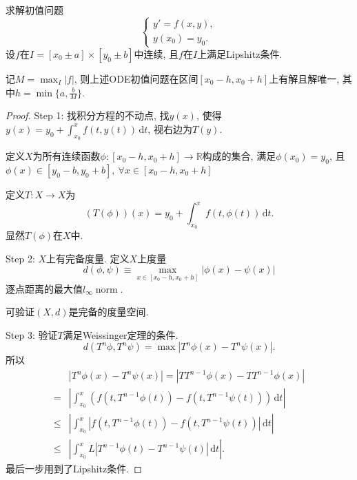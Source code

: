 \begin{theorem}
  求解初值问题
  \begin{equation}
    \begin{cases}
      y' = f(x,y), \\
      y(x_0) = y_0.
    \end{cases}
  \end{equation}
  设$f$在$I = [x_0 \pm a] \times [y_0 \pm b]$中连续, 且$f$在$I$上满足Lipshitz条件.

  记$M = \max _{I} |f|$, 则上述ODE初值问题在区间$[x_0-h, x_0+h]$上有解且解唯一, 其中$h = \min \{ a, \frac{b}{M} \}$.
\end{theorem}

\begin{proof}
  Step 1: 找积分方程的不动点, 找$y(x)$, 使得$y(x) = y_0 + \int_{x_0}^{x} f(t,y(t)) \, \mathrm{d}t $, 视右边为$T(y)$.

  定义$X$为所有连续函数$\phi\colon [x_0-h,x_0+h] \to \mathbb{R}$构成的集合, 满足$\phi (x_0) = y_0$, 且$\phi (x) \in [y_0-b, y_0+b], \ \forall x \in  [x_0-h,x_0+h]$

  定义$T\colon X \to X$为
  \begin{equation}
    \left( T(\phi ) \right)(x) = y_0 + \int_{x_0}^{x} f(t,\phi (t)) \, \mathrm{d}t. 
  \end{equation}
  显然$T(\phi )$在$X$中.

  Step 2: $X$上有完备度量.
  定义$X$上度量
  \begin{equation}
    d(\phi ,\psi ) \equiv \max_{x \in [x_0-h,x_0+h]} \left| \phi (x) - \psi (x) \right|
  \end{equation}
  逐点距离的最大值$l_{\infty } \operatorname{norm}$.

  可验证$(X,d)$是完备的度量空间.

  Step 3: 验证$T$满足Weissinger定理的条件.
  \begin{equation}
    d\left( T^{n}\phi , T^{n}\psi  \right) = \max \left| T^{n}\phi(x) - T^{n}\psi(x)  \right|.
  \end{equation}
  所以
  \begin{equation}
    \begin{aligned}
  & \left| T^{n}\phi(x) - T^{n}\psi (x) \right| = \left| T T^{n-1}\phi (x) - TT^{n-1} \phi (x) \right|\\
      = & \left| \int_{x_0}^{x} \left( f\left( t, T^{n-1}\phi (t) \right) - f\left( t, T^{n-1}\psi (t) \right) \right) \, \mathrm{d}t  \right| \\
    \le & \left|  \int_{x_0}^{x} \left| f\left( t, T^{n-1}\phi (t) \right) - f\left( t, T^{n-1}\psi (t) \right) \right| \, \mathrm{d}t \right| \\
    \le & \left| \int_{x_0}^{x} L\left| T^{n-1}\phi (t) - T^{n-1}\psi (t)\right| \, \mathrm{d}t  \right|.
    \end{aligned}
  \end{equation}
  最后一步用到了Lipshitz条件.


\end{proof}
